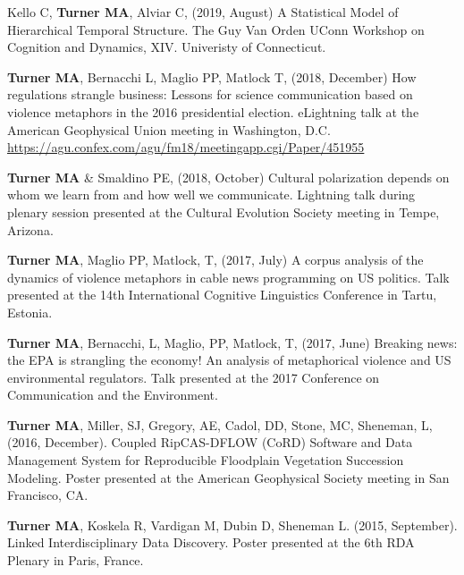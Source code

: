 \documentclass[letterpaper,11pt,oneside]{article}
\begin{document}
  \begin{hangparas}{0.25in}{1}
   Kello C, \textbf{Turner MA}, Alviar C, (2019, August) A Statistical Model of Hierarchical Temporal Structure. The Guy Van Orden UConn Workshop on Cognition and Dynamics, XIV. Univeristy of Connecticut.

\textbf{Turner MA}, Bernacchi L, Maglio PP, Matlock T, (2018, December) How regulations strangle business: Lessons for science communication based on violence metaphors in the 2016 presidential election. eLightning talk at the American Geophysical Union meeting in Washington, D.C. \url{https://agu.confex.com/agu/fm18/meetingapp.cgi/Paper/451955}

\textbf{Turner MA} \& Smaldino PE, (2018, October) Cultural polarization depends on whom we learn from and how well we communicate. Lightning talk during plenary session presented at the Cultural Evolution Society meeting in Tempe, Arizona.

\textbf{Turner MA}, Maglio PP, Matlock, T, (2017, July) A corpus analysis of the dynamics of violence metaphors in cable news programming on US politics. Talk presented at the 14th International Cognitive Linguistics Conference in Tartu, Estonia.

\textbf{Turner MA}, Bernacchi, L, Maglio, PP, Matlock, T, (2017, June) Breaking news: the EPA is strangling the economy! An analysis of metaphorical violence and US environmental regulators. Talk presented at the 2017 Conference on Communication and the Environment.

\textbf{Turner MA}, Miller, SJ, Gregory, AE, Cadol, DD, Stone, MC, Sheneman, L, (2016, December). Coupled RipCAS-DFLOW (CoRD) Software and Data Management System for Reproducible Floodplain Vegetation Succession Modeling. Poster presented at the American Geophysical Society meeting in San Francisco, CA.

\textbf{Turner MA}, Koskela R, Vardigan M, Dubin D, Sheneman L. (2015, September). Linked Interdisciplinary Data Discovery. Poster presented at the 6th RDA Plenary in Paris, France. 
  \end{hangparas}


\end{document}
